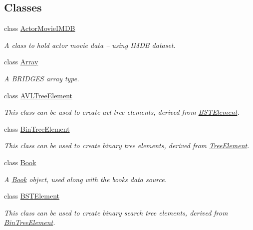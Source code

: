 \subsection*{Classes}
\begin{DoxyCompactItemize}
\item 
class \mbox{\hyperlink{classbridges_1_1_actor_movie_i_m_d_b}{Actor\+Movie\+I\+M\+DB}}
\begin{DoxyCompactList}\small\item\em A class to hold actor movie data -- using I\+M\+DB dataset. \end{DoxyCompactList}\item 
class \mbox{\hyperlink{classbridges_1_1_array}{Array}}
\begin{DoxyCompactList}\small\item\em A B\+R\+I\+D\+G\+ES array type. \end{DoxyCompactList}\item 
class \mbox{\hyperlink{classbridges_1_1_a_v_l_tree_element}{A\+V\+L\+Tree\+Element}}
\begin{DoxyCompactList}\small\item\em This class can be used to create avl tree elements, derived from \mbox{\hyperlink{classbridges_1_1_b_s_t_element}{B\+S\+T\+Element}}. \end{DoxyCompactList}\item 
class \mbox{\hyperlink{classbridges_1_1_bin_tree_element}{Bin\+Tree\+Element}}
\begin{DoxyCompactList}\small\item\em This class can be used to create binary tree elements, derived from \mbox{\hyperlink{classbridges_1_1_tree_element}{Tree\+Element}}. \end{DoxyCompactList}\item 
class \mbox{\hyperlink{classbridges_1_1_book}{Book}}
\begin{DoxyCompactList}\small\item\em A \mbox{\hyperlink{classbridges_1_1_book}{Book}} object, used along with the books data source. \end{DoxyCompactList}\item 
class \mbox{\hyperlink{classbridges_1_1_b_s_t_element}{B\+S\+T\+Element}}
\begin{DoxyCompactList}\small\item\em This class can be used to create binary search tree elements, derived from \mbox{\hyperlink{classbridges_1_1_bin_tree_element}{Bin\+Tree\+Element}}. \end{DoxyCompactList}\item 

\end{DoxyCompactItemize}
